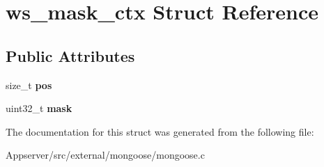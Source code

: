 \hypertarget{structws__mask__ctx}{}\section{ws\+\_\+mask\+\_\+ctx Struct Reference}
\label{structws__mask__ctx}
\subsection*{Public Attributes}
\begin{DoxyCompactItemize}
\item 
size\+\_\+t {\bfseries pos}\hypertarget{structws__mask__ctx_a475d1d7c7e1ffef41e9ddd94c738dc93}{}\label{structws__mask__ctx_a475d1d7c7e1ffef41e9ddd94c738dc93}

\item 
uint32\+\_\+t {\bfseries mask}\hypertarget{structws__mask__ctx_a5d0e6527780100ef7cac724b7b7c43ca}{}\label{structws__mask__ctx_a5d0e6527780100ef7cac724b7b7c43ca}

\end{DoxyCompactItemize}


The documentation for this struct was generated from the following file\+:\begin{DoxyCompactItemize}
\item 
Appserver/src/external/mongoose/mongoose.\+c\end{DoxyCompactItemize}
